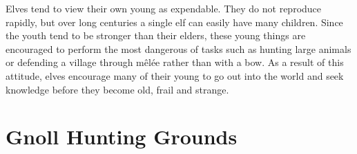 \begin{multicols}{2}
Elves tend to view their own young as expendable.
They do not reproduce rapidly, but over long centuries a single elf can easily have many children.
Since the youth tend to be stronger than their elders, these young things are encouraged to perform the most dangerous of tasks such as hunting large animals or defending a village through m\^{e}l\'{e}e rather than with a bow.
As a result of this attitude, elves encourage many of their young to go out into the world and seek knowledge before they become old, frail and strange.

\end{multicols}

\section[Gnolls]{Gnoll Hunting Grounds \Nl}

